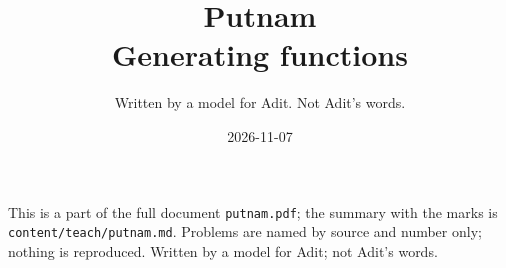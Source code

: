 
\title{Putnam\\[0.3em]\large Generating functions}
\author{Written by a model for Adit. Not Adit's words.}
\date{2026-11-07}

\maketitle
\noindent\small This is a part of the full document \texttt{putnam.pdf}; the summary with the marks is \texttt{content/teach/putnam.md}. Problems are named by source and number only; nothing is reproduced. Written by a model for Adit; not Adit's words.\normalsize



